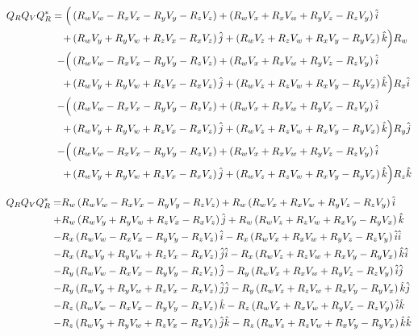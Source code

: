 \begin{align*}
Q_RQ_VQ_R^* = 
\Big(
	& \left(R_wV_w - R_xV_x - R_yV_y - R_zV_z\right)+
	  \left(R_wV_x + R_xV_w + R_yV_z - R_zV_y\right)\hat{\textcolor{black}{i}}\\+
	& \left(R_wV_y + R_yV_w + R_zV_x - R_xV_z\right)\hat{\textcolor{black}{j}}+
	  \left(R_wV_z + R_zV_w + R_xV_y - R_yV_x\right)\hat{\textcolor{black}{k}}\Big)
	R_w\\-
\Big( 
	& \left(R_wV_w - R_xV_x - R_yV_y - R_zV_z\right)+
	  \left(R_wV_x + R_xV_w + R_yV_z - R_zV_y\right)\hat{\textcolor{black}{i}}\\+
	& \left(R_wV_y + R_yV_w + R_zV_x - R_xV_z\right)\hat{\textcolor{black}{j}}+
	  \left(R_wV_z + R_zV_w + R_xV_y - R_yV_x\right)\hat{\textcolor{black}{k}}\Big)
	R_x\hat{\textcolor{black}{i}}\\-
\Big(
	& \left(R_wV_w - R_xV_x - R_yV_y - R_zV_z\right)+
	  \left(R_wV_x + R_xV_w + R_yV_z - R_zV_y\right)\hat{\textcolor{black}{i}}\\+
	& \left(R_wV_y + R_yV_w + R_zV_x - R_xV_z\right)\hat{\textcolor{black}{j}}+
	  \left(R_wV_z + R_zV_w + R_xV_y - R_yV_x\right)\hat{\textcolor{black}{k}}\Big)
	R_y\hat{\textcolor{black}{j}}\\-
\Big(
	& \left(R_wV_w - R_xV_x - R_yV_y - R_zV_z\right)+
	  \left(R_wV_x + R_xV_w + R_yV_z - R_zV_y\right)\hat{\textcolor{black}{i}}\\+
	& \left(R_wV_y + R_yV_w + R_zV_x - R_xV_z\right)\hat{\textcolor{black}{j}}+
	  \left(R_wV_z + R_zV_w + R_xV_y - R_yV_x\right)\hat{\textcolor{black}{k}}\Big)
	R_z\hat{\textcolor{black}{k}}
\end{align*}

\begin{align*}
Q_RQ_VQ_R^* = 
	 & R_w\left(R_wV_w - R_xV_x - R_yV_y - R_zV_z\right)
	+  R_w\left(R_wV_x + R_xV_w + R_yV_z - R_zV_y\right)\hat{\textcolor{black}{i}}\\
	+& R_w\left(R_wV_y + R_yV_w + R_zV_x - R_xV_z\right)\hat{\textcolor{black}{j}}
	+  R_w\left(R_wV_z + R_zV_w + R_xV_y - R_yV_x\right)\hat{\textcolor{black}{k}}
	\\
	-& R_x\left(R_wV_w - R_xV_x - R_yV_y - R_zV_z\right)\hat{\textcolor{black}{i}}
	-  R_x\left(R_wV_x + R_xV_w + R_yV_z - R_zV_y\right)\hat{\textcolor{black}{i}}\hat{\textcolor{black}{i}}\\
	-& R_x\left(R_wV_y + R_yV_w + R_zV_x - R_xV_z\right)\hat{\textcolor{black}{j}}\hat{\textcolor{black}{i}}
	-  R_x\left(R_wV_z + R_zV_w + R_xV_y - R_yV_x\right)\hat{\textcolor{black}{k}}\hat{\textcolor{black}{i}}
	\\
	-& R_y\left(R_wV_w - R_xV_x - R_yV_y - R_zV_z\right)\hat{\textcolor{black}{j}}
	-  R_y\left(R_wV_x + R_xV_w + R_yV_z - R_zV_y\right)\hat{\textcolor{black}{i}}\hat{\textcolor{black}{j}}\\
	-& R_y\left(R_wV_y + R_yV_w + R_zV_x - R_xV_z\right)\hat{\textcolor{black}{j}}\hat{\textcolor{black}{j}}
	-  R_y\left(R_wV_z + R_zV_w + R_xV_y - R_yV_x\right)\hat{\textcolor{black}{k}}\hat{\textcolor{black}{j}}
	\\
	-& R_z\left(R_wV_w - R_xV_x - R_yV_y - R_zV_z\right)\hat{\textcolor{black}{k}}
	-  R_z\left(R_wV_x + R_xV_w + R_yV_z - R_zV_y\right)\hat{\textcolor{black}{i}}\hat{\textcolor{black}{k}}\\
	-& R_z\left(R_wV_y + R_yV_w + R_zV_x - R_xV_z\right)\hat{\textcolor{black}{j}}\hat{\textcolor{black}{k}}
	-  R_z\left(R_wV_z + R_zV_w + R_xV_y - R_yV_x\right)\hat{\textcolor{black}{k}}\hat{\textcolor{black}{k}}
\end{align*}

